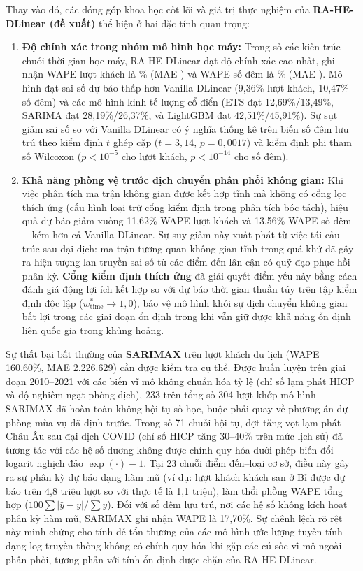 \documentclass[10pt,journal,compsoc]{IEEEtran}
\begin{document}
Thay vào đó, các đóng góp khoa học cốt lõi và giá trị thực nghiệm của \textbf{RA-HE-DLinear (đề xuất)} thể hiện ở hai đặc tính quan trọng:
\begin{enumerate}
    \item \textbf{Độ chính xác trong nhóm mô hình học máy:} Trong số các kiến trúc chuỗi thời gian học máy, RA-HE-DLinear đạt độ chính xác cao nhất, ghi nhận WAPE lượt khách là \ReviewerArrivalWAPE{}\% (MAE \ReviewerArrivalMAE{}) và WAPE số đêm là \ReviewerNightsWAPE{}\% (MAE \ReviewerNightsMAE{}). Mô hình đạt sai số dự báo thấp hơn Vanilla DLinear (9,36\% lượt khách, 10,47\% số đêm) và các mô hình kinh tế lượng cổ điển (ETS đạt 12,69\%/13,49\%, SARIMA đạt 28,19\%/26,37\%, và LightGBM đạt 42,51\%/45,91\%). Sự sụt giảm sai số so với Vanilla DLinear có ý nghĩa thống kê trên biến số đêm lưu trú theo kiểm định $t$ ghép cặp ($t = 3{,}14$, $p = 0{,}0017$) và kiểm định phi tham số Wilcoxon ($p < 10^{-5}$ cho lượt khách, $p < 10^{-14}$ cho số đêm).
    \item \textbf{Khả năng phòng vệ trước dịch chuyển phân phối không gian:} Khi việc phân tích ma trận không gian được kết hợp tĩnh mà không có cổng lọc thích ứng (cấu hình loại trừ cổng kiểm định trong phân tích bóc tách), hiệu quả dự báo giảm xuống 11,62\% WAPE lượt khách và 13,56\% WAPE số đêm---kém hơn cả Vanilla DLinear. Sự suy giảm này xuất phát từ việc tái cấu trúc sau đại dịch: ma trận tương quan không gian tĩnh trong quá khứ đã gây ra hiện tượng lan truyền sai số từ các điểm đến lân cận có quỹ đạo phục hồi phân kỳ. \textbf{Cổng kiểm định thích ứng} đã giải quyết điểm yếu này bằng cách đánh giá động lợi ích kết hợp so với dự báo thời gian thuần túy trên tập kiểm định độc lập ($w_{\mathrm{time}}^* \to 1{,}0$), bảo vệ mô hình khỏi sự dịch chuyển không gian bất lợi trong các giai đoạn ổn định trong khi vẫn giữ được khả năng ổn định liên quốc gia trong khủng hoảng.
\end{enumerate}

Sự thất bại bất thường của \textbf{SARIMAX} trên lượt khách du lịch (WAPE 160,60\%, MAE 2.226.629) cần được kiểm tra cụ thể. Được huấn luyện trên giai đoạn 2010--2021 với các biến vĩ mô không chuẩn hóa tỷ lệ (chỉ số lạm phát HICP và độ nghiêm ngặt phòng dịch), 233 trên tổng số 304 lượt khớp mô hình SARIMAX đã hoàn toàn không hội tụ số học, buộc phải quay về phương án dự phòng mùa vụ đã định trước. Trong số 71 chuỗi hội tụ, đợt tăng vọt lạm phát Châu Âu sau đại dịch COVID (chỉ số HICP tăng 30--40\% trên mức lịch sử) đã tương tác với các hệ số dương không được chính quy hóa dưới phép biến đổi logarit nghịch đảo $\exp(\cdot)-1$. Tại 23 chuỗi điểm đến--loại cơ sở, điều này gây ra sự phân kỳ dự báo dạng hàm mũ (ví dụ: lượt khách khách sạn ở Bỉ được dự báo trên 4,8 triệu lượt so với thực tế là 1,1 triệu), làm thổi phồng WAPE tổng hợp ($100\sum|\hat{y}-y|/\sum y$). Đối với số đêm lưu trú, nơi các hệ số không kích hoạt phân kỳ hàm mũ, SARIMAX ghi nhận WAPE là 17,70\%. Sự chênh lệch rõ rệt này minh chứng cho tính dễ tổn thương của các mô hình ước lượng tuyến tính dạng log truyền thống không có chính quy hóa khi gặp các cú sốc vĩ mô ngoài phân phối, tương phản với tính ổn định được chặn của RA-HE-DLinear.
\end{document}
